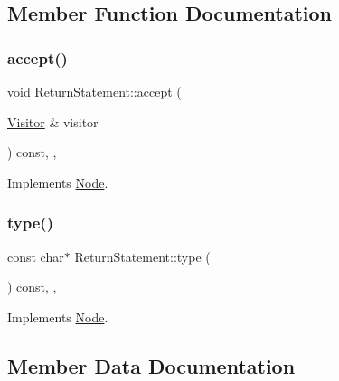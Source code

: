 \subsection{Member Function Documentation}
\mbox{\label{struct_return_statement_af266bfb192300eeffc2d7454b019dd1a}} 
\subsubsection{\texorpdfstring{accept()}{accept()}}
{\footnotesize\ttfamily void Return\+Statement\+::accept (\begin{DoxyParamCaption}\item[{\hyperlink{struct_visitor}{Visitor} \&}]{visitor }\end{DoxyParamCaption}) const\hspace{0.3cm}{\ttfamily [inline]}, {\ttfamily [override]}, {\ttfamily [virtual]}}



Implements \hyperlink{struct_node_a10bd7af968140bbf5fa461298a969c71}{Node}.

\mbox{\label{struct_return_statement_a4eff2224709e229d34fa4643f708a3a7}} 
\subsubsection{\texorpdfstring{type()}{type()}}
{\footnotesize\ttfamily const char$\ast$ Return\+Statement\+::type (\begin{DoxyParamCaption}{ }\end{DoxyParamCaption}) const\hspace{0.3cm}{\ttfamily [inline]}, {\ttfamily [override]}, {\ttfamily [virtual]}}



Implements \hyperlink{struct_node_a82f29420d0a38efcc370352528e94e9b}{Node}.



\subsection{Member Data Documentation}
\mbox{\label{struct_return_statement_aeead2cb2bcecfed685d54bb7ee5456f2}} 
